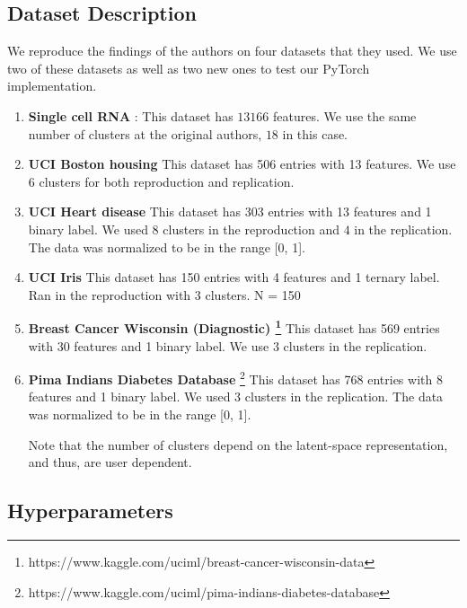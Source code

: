 \subsection{Dataset Description}

We reproduce the findings of the authors on four datasets that they used. We use two of these datasets as well as two new ones to test our PyTorch implementation.
\begin{enumerate}
    \item \textbf{Single cell RNA} \cite{bipolar}: This dataset has $13166$ features. We use the same number of clusters at the original authors, $18$ in this case. 
    \item \textbf{UCI Boston housing} This dataset has 506 entries with 13 features. We use $6$ clusters for both reproduction and replication.
    \item \textbf{UCI Heart disease} This dataset has 303 entries with 13 features and 1 binary label. We used $8$ clusters in the reproduction and $4$ in the replication. The data was normalized to be in the range [0, 1]. 
    \item \textbf{UCI Iris} This dataset has 150 entries with 4 features and 1 ternary label. Ran in the reproduction with $3$ clusters. N = 150
    \item \textbf{Breast Cancer Wisconsin (Diagnostic) \footnote{https://www.kaggle.com/uciml/breast-cancer-wisconsin-data}} This dataset has 569 entries with 30 features and 1 binary label. We use $3$ clusters in the replication.
    \item \textbf{Pima Indians Diabetes Database} \footnote{https://www.kaggle.com/uciml/pima-indians-diabetes-database} This dataset has 768 entries with 8 features and 1 binary label. We used $3$ clusters in the replication. The data was normalized to be in the range [0, 1].

Note that the number of clusters depend on the latent-space representation, and thus, are user dependent.
    
\end{enumerate}
\subsection{Hyperparameters}

